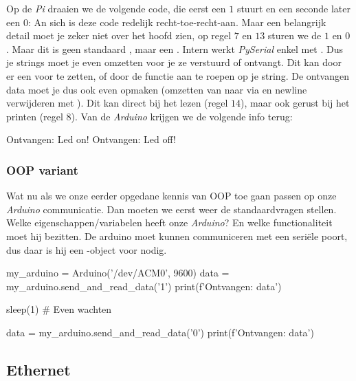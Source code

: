 Op de \textit{Pi} draaien we de volgende code, die eerst een $1$ stuurt en een seconde later een $0$:
An sich is deze code redelijk recht-toe-recht-aan. Maar een belangrijk detail moet je zeker niet over het hoofd zien, op regel $7$ en $13$ sturen we de $1$ en $0$. Maar dit is geen standaard , maar een . Intern werkt \textit{PySerial} enkel met . Dus je strings moet je even omzetten voor je ze verstuurd of ontvangt. Dit kan door er een  voor te zetten, of door de functie  aan te roepen op je string.\newline
De ontvangen data moet je dus ook even opmaken (omzetten van  naar  via  en newline verwijderen met ). Dit kan direct bij het lezen (regel $14$), maar ook gerust bij het printen (regel $8$). Van de \textit{Arduino} krijgen we de volgende info terug:
\begin{python}
Ontvangen: Led on!
Ontvangen: Led off!
\end{python}

\newpage

\subsubsection{OOP variant}
Wat nu als we onze eerder opgedane kennis van OOP toe gaan passen op onze \textit{Arduino} communicatie. Dan moeten we eerst weer de standaardvragen stellen. Welke eigenschappen/variabelen heeft onze \textit{Arduino}? En welke functionaliteit moet hij bezitten. \newline
De arduino moet kunnen communiceren met een seriële poort, dus daar is hij een -object voor nodig. 

\begin{python}
my_arduino = Arduino('/dev/ACM0', 9600)
data = my_arduino.send_and_read_data('1')
print(f'Ontvangen: {data}')

sleep(1)  # Even wachten

data = my_arduino.send_and_read_data('0')
print(f'Ontvangen: {data}')
\end{python}

\newpage

\subsection{Ethernet}

